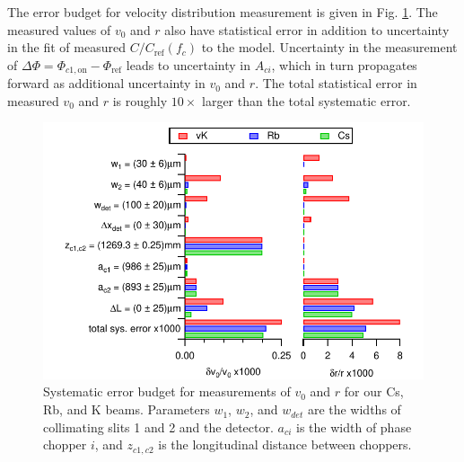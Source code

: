 \documentclass[twocolumn,prl,showpacs,superscriptaddress]{revtex4-1}   %
\newcommand{\figref}[1]{Fig. \ref{#1}}
\begin{document}
The error budget for velocity distribution measurement is given in \figref{velError}. The measured values of $v_0$ and $r$ also have statistical error in addition to uncertainty in the fit of measured $C/C_{\mathrm{ref}}(f_c)$ to the model. Uncertainty in the measurement of $\Delta\Phi = \Phi_{c1,\mathrm{on}} - \Phi_{\mathrm{ref}}$ leads to uncertainty in $A_{ci}$, which in turn propagates forward as additional uncertainty in $v_0$ and $r$. The total statistical error in measured $v_0$ and $r$ is roughly $10\times$ larger than the total systematic error.

\begin{figure}
\includegraphics[width=\linewidth,keepaspectratio]{displayVelErrors.pdf}
\caption{\label{velError}Systematic error budget for measurements of $v_0$ and $r$ for our Cs, Rb, and K beams. Parameters $w_1$, $w_2$, and $w_{det}$ are the widths of collimating slits 1 and 2 and the detector. $a_{ci}$ is the width of phase chopper $i$, and $z_{c1,c2}$ is the longitudinal distance between choppers.}
\end{figure}
\end{document}
